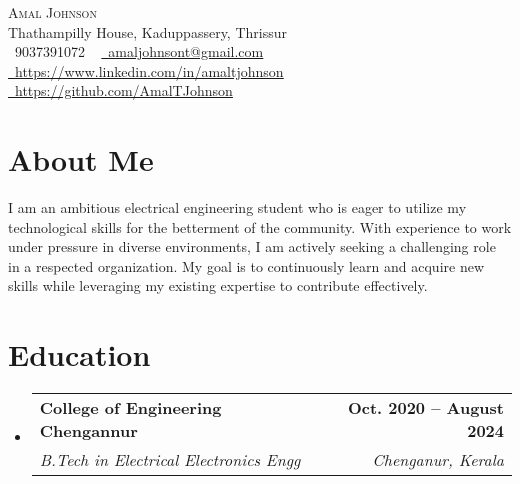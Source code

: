 \documentclass[letterpaper,11pt]{article}
\makeatletter
\newcommand{\resumeSubheading}[4]{
  \vspace{-2pt}\item
    \begin{tabular*}{1.0\textwidth}[t]{l@{\extracolsep{\fill}}r}
      \textbf{#1} & \textbf{\small #2} \\
      \textit{\small#3} & \textit{\small #4} \\
    \end{tabular*}\vspace{-7pt}
}
\newcommand{\resumeSubHeadingListStart}{\begin{itemize}[leftmargin=0.0in, label={}]}
\newcommand{\resumeSubHeadingListEnd}{\end{itemize}}
\makeatother
\begin{document}

\begin{center}
    {\Huge \scshape Amal Johnson} \\ \vspace{8pt}
    Thathampilly House, Kaduppassery, Thrissur \\ \vspace{1pt}
    \small \raisebox{-0.1\height}\faPhone\ 9037391072 ~ \href{mailto:x@gmail.com}{\raisebox{-0.2\height}\faEnvelope\  \underline{amaljohnsont@gmail.com}} ~ 
    \href{https://linkedin.com/in//}{\raisebox{-0.2\height}\faLinkedin\ \underline{https://www.linkedin.com/in/amaltjohnson}}  ~
   \vspace{4pt}   
    \href{https://github.com/}{\raisebox{-0.2\height}\faGithub\ \underline{https://github.com/AmalTJohnson}}
    \vspace{7pt}
\end{center}

    \vspace{-12pt}
    \section{About Me}
  \resumeSubHeadingListStart
    
      {I am an ambitious electrical engineering student who is eager to utilize my technological  skills for the betterment of the community. With experience to work under pressure in diverse environments, I am actively seeking a challenging role in a respected organization. My goal is to continuously learn and acquire new skills while leveraging my existing expertise to contribute effectively.}
  \resumeSubHeadingListEnd

\section{Education}
  \resumeSubHeadingListStart
    \resumeSubheading
      {College of Engineering Chengannur}{Oct. 2020 -- August 2024}
      {B.Tech in Electrical  Electronics Engg }{Chenganur, Kerala}
  \resumeSubHeadingListEnd
  
\end{document}
